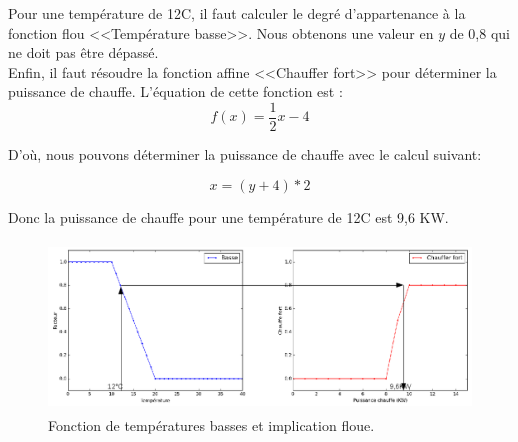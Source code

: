 \documentclass[a4paper,11pt]{article}
\begin{document}
Pour une température de 12\degre C, il faut calculer le degré 
d'appartenance à la fonction flou <<Température basse>>. Nous 
obtenons une valeur en $y$ de 0,8 qui ne doit pas être dépassé.\\

Enfin, il faut résoudre la fonction affine <<Chauffer fort>> pour 
déterminer la puissance de chauffe. L'équation de cette fonction 
est :
$$
f(x)=\frac{1}{2}x-4
$$

D'où, nous pouvons déterminer la puissance de chauffe avec le 
calcul suivant:

$$
x = (y+4) * 2
$$

Donc la puissance de chauffe pour une température de 12\degre C 
est 9,6 KW.

\begin{figure}[H]
  \begin{center}
  \includegraphics[height=170px]{images/low_mamdani_arrow.png}
  \caption{Fonction de températures basses et implication floue.}
  \end{center}
\end{figure}
\end{document}
